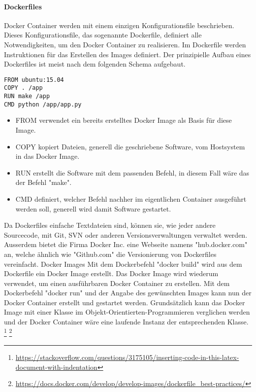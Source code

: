 \paragraph{Dockerfiles}
Docker Container werden mit einem einzigen Konfigurationsfile beschrieben.
Dieses Konfigurationsfile, das sogenannte Dockerfile, definiert alle Notwendigkeiten, um den Docker Container zu realisieren.
Im Dockerfile werden Instruktionen für das Erstellen des Images definiert.
Der prinzipielle Aufbau eines Dockerfiles ist meist nach dem folgenden Schema aufgebaut.
\begin{lstlisting}
FROM ubuntu:15.04
COPY . /app
RUN make /app
CMD python /app/app.py
\end{lstlisting}
\begin{itemize}
	\item FROM  verwendet ein bereits erstelltes Docker Image als Basis für diese Image.
	\item COPY  kopiert Dateien, generell die geschriebene Software, vom Hostsystem in das Docker Image.
	\item RUN   erstellt die Software mit dem passenden Befehl, in diesem Fall wäre das der Befehl "make".
	\item CMD   definiert, welcher Befehl nachher im eigentlichen Container ausgeführt werden soll, generell wird damit Software gestartet.
\end{itemize}
Da Dockerfiles einfache Textdateien sind, können sie, wie jeder andere Sourcecode, mit Git, SVN oder anderen Versionsverwaltungen verwaltet werden.
Ausserdem bietet die Firma Docker Inc. eine Webseite namens "hub.docker.com" an, welche ähnlich wie "Github.com" die Versionierung von Dockerfiles vereinfacht.
Docker Images
Mit dem Dockerbefehl "docker build" wird aus dem Dockerfile ein Docker Image erstellt.
Das Docker Image wird wiederum verwendet, um einen ausführbaren Docker Container zu erstellen.
Mit dem Dockerbefehl "docker run" und der Angabe des gewünschten Images kann nun der Docker Container erstellt und gestartet werden.
Grundsätzlich kann das Docker Image mit einer Klasse im Objekt-Orientierten-Programmieren verglichen werden und der Docker Container wäre eine laufende Instanz der entsprechenden Klasse. 
\footnote{\url{https://stackoverflow.com/questions/3175105/inserting-code-in-this-latex-document-with-indentation}}
\footnote{\url{https://docs.docker.com/develop/develop-images/dockerfile_best-practices/}}

